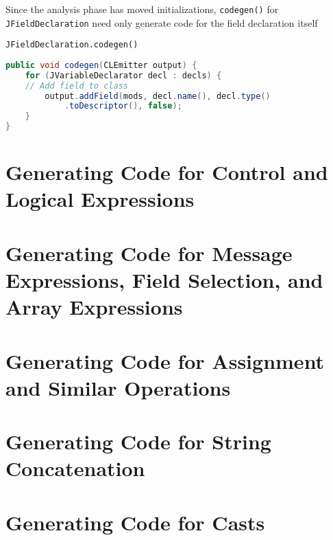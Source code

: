 \documentclass[8pt,a4paper,compress]{beamer}
\begin{document}
\begin{frame}[fragile]
\pause

Since the analysis phase has moved initializations, \lstinline{codegen()} for \lstinline{JFieldDeclaration} need only generate code for the field declaration itself

\pause
\bigskip

\lstinline{JFieldDeclaration.codegen()}
\begin{lstlisting}[language=Java]
public void codegen(CLEmitter output) {
    for (JVariableDeclarator decl : decls) {
	// Add field to class
        output.addField(mods, decl.name(), decl.type()
            .toDescriptor(), false);
    }
}
\end{lstlisting}
\end{frame}

\section{Generating Code for Control and Logical Expressions}
\begin{frame}[fragile]
\pause

\end{frame}


\section{Generating Code for Message Expressions, Field Selection, and Array Expressions}
\begin{frame}[fragile]
\pause


\end{frame}

\section{Generating Code for Assignment and Similar Operations}
\begin{frame}[fragile]
\pause


\end{frame}

\section{Generating Code for String Concatenation}
\begin{frame}[fragile]
\pause


\end{frame}

\section{Generating Code for Casts}
\begin{frame}[fragile]
\pause


\end{frame}
\end{document}
